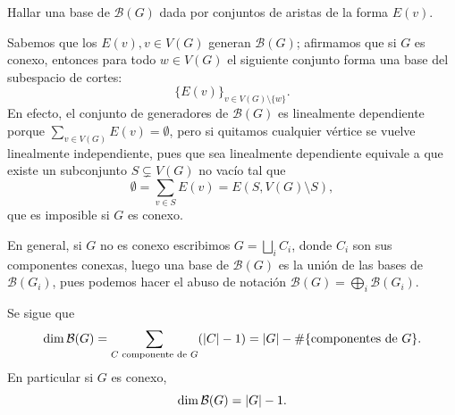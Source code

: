 \documentclass[../main.tex]{subfiles}
\begin{document}
\begin{exercise}
Hallar una base de $\mathcal{B}(G)$ dada por conjuntos de aristas de la forma $E(v)$.
\end{exercise}
\begin{solution}
Sabemos que los $E(v), v \in V(G)$ generan $\mathcal{B}(G)$; afirmamos que si $G$ es conexo, entonces para todo $w \in V(G)$ el siguiente conjunto forma una base del subespacio de cortes:
$$
\{ E(v) \}_{v \in V(G) \setminus \{w\}}.
$$
En efecto, el conjunto de generadores de $\mathcal{B}(G)$ es linealmente dependiente porque $\sum_{v \in V(G)} E(v) = \emptyset$, pero si quitamos cualquier vértice se vuelve linealmente independiente, pues que sea linealmente dependiente equivale a que existe un subconjunto $S \subsetneq V(G)$ no vacío tal que
$$
\emptyset = \sum_{v \in S} E(v) = E(S, V(G) \setminus S),
$$
que es imposible si $G$ es conexo.

En general, si $G$ no es conexo escribimos $G = \bigsqcup_i C_i$, donde $C_i$ son sus componentes conexas, luego una base de $\mathcal{B}(G)$ es la unión de las bases de $\mathcal{B}(G_i)$, pues podemos hacer el abuso de notación $\mathcal{B}(G) = \bigoplus_i \mathcal{B}(G_i)$.
\end{solution}



\begin{corollary}
Se sigue que
$$
\dim \mathcal{B} (G) = \sum_{C \text{ componente de $G$}} (\left \vert C \right \vert -1) = \left \vert G \right \vert -  \# \{\text{componentes de $G$}\}.
$$
En particular si $G$ es conexo,
\[
    \dim \mathcal{B} (G) = \left \vert G \right \vert -1.
\]
\end{corollary}
\end{document}
